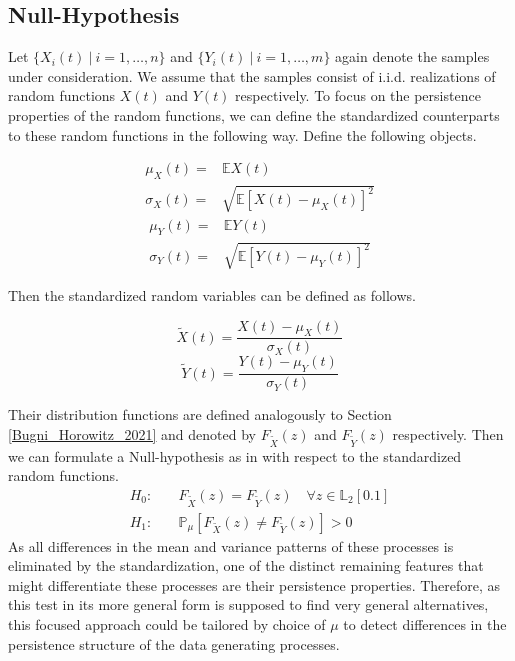 \documentclass[12pt, a4paper]{article}
\theoremstyle{MAstyle} \newtheorem{assumption}{Assumption}[section]
\theoremstyle{MAstyle} \newtheorem{definition}{Definition}[section]
\theoremstyle{MAstyle} \newtheorem{theorem}{Theorem}[section]
\begin{document}
		\subsection{Null-Hypothesis}
		Let $\{X_i(t) \ | \  i = 1, \dots, n\}$ and $\{Y_i(t) \ | \  i = 1, \dots, m\}$ again denote the samples under consideration. We assume that the samples consist of i.i.d. realizations of random functions $X(t)$ and $Y(t)$ respectively.
		To focus on the persistence properties of the random functions, we can define the standardized counterparts to these random functions in the following way. Define the following objects.
		\begin{multicols}{2}
			\noindent
			\begin{equation*}
				\begin{split}
					\mu_{X}(t) = &\mathbb{E} X(t) \\
					\sigma_{X}(t) = &\sqrt{\mathbb{E}\left[X(t) - \mu_{X}(t)\right]^2}
				\end{split}
			\end{equation*}
			\begin{equation}
				\begin{split}
					\mu_{Y}(t) = &\mathbb{E} Y(t) \\
					\sigma_{Y}(t) = &\sqrt{\mathbb{E}\left[Y(t) - \mu_{Y}(t)\right]^2}
				\end{split}
			\end{equation}
		\end{multicols}
		Then the standardized random variables can be defined as follows.
		\begin{multicols}{2}
			\noindent
			\begin{equation*}
				\tilde{X}(t) = \frac{X(t) - \mu_{X}(t)}{\sigma_{X}(t)}
			\end{equation*}
			\begin{equation}
				\tilde{Y}(t) = \frac{Y(t) - \mu_{Y}(t)}{\sigma_{Y}(t)}
			\end{equation}
		\end{multicols}
		Their distribution functions are defined analogously to Section \ref{Bugni_Horowitz_2021} and denoted by $F_{\tilde{X}}(z)$ and $F_{\tilde{Y}}(z)$ respectively. Then we can formulate a Null-hypothesis as in \cite{bugni_permutation_2021} with respect to the standardized random functions.
		\begin{equation}
			\begin{split}
				H_0: \quad &F_{\tilde{X}}(z) = F_{\tilde{Y}}(z) \quad \forall z \in \mathbb{L}_2[0.1] \\
				H_1: \quad &\mathbb{P}_{\mu}\left[F_{\tilde{X}}(z) \neq F_{\tilde{Y}}(z)\right] > 0
			\end{split}
		\end{equation}
		As all differences in the mean and variance patterns of these processes is eliminated by the standardization, one of the distinct remaining features that might differentiate these processes are their persistence properties. Therefore, as this test in its more general form is supposed to find very general alternatives, this focused approach could be tailored by choice of $\mu$ to detect differences in the persistence structure of the data generating processes. \\
		
\end{document}
